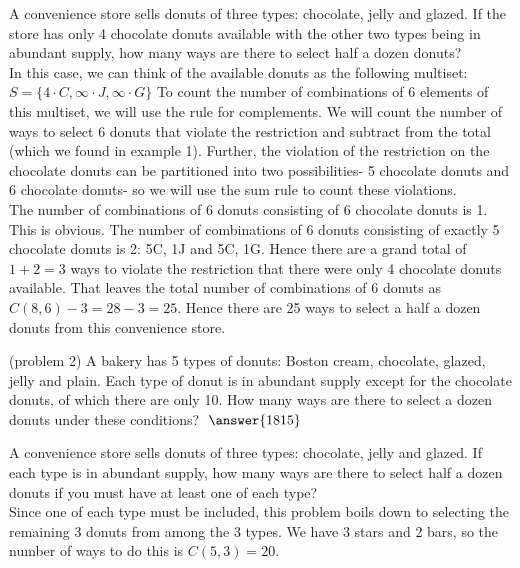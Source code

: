 \documentclass[handout]{ximera}
\begin{document}
 

\begin{example}[example 2]
A convenience store sells donuts of three types: chocolate, jelly and glazed.  
If the store has only 4 chocolate donuts available with the other two types 
being in abundant supply, how many ways are there to select half a dozen donuts?\\
In this case, we can think of the available donuts as the following multiset: 
$S = \{4\cdot C, \infty \cdot J, \infty \cdot G\}$ To count the number of 
combinations of 6 elements of this multiset, we will use the rule for complements. 
We will count the number of ways to select 6 donuts that violate the restriction and 
subtract from the total (which we found in example 1).  Further, the violation of the 
restriction on the chocolate donuts can be partitioned into two possibilities- 5 chocolate 
donuts and 6 chocolate donuts- so we will use the sum rule to count these violations.\\
The number of combinations of 6 donuts consisting of 6 chocolate donuts is 1. 
This is obvious.  The number of combinations of 6 donuts consisting of 
exactly 5 chocolate donuts is 2: 5C, 1J and 5C, 1G.  
Hence there are a grand total of $1+2 =3$
ways to violate the restriction that there were only 4 chocolate donuts available.  
That leaves the total number of combinations of 6 donuts as $C(8,6) -3 = 28 - 3 = 25$.
Hence there are 25 ways to select a half a dozen donuts from this convenience store.
\end{example}


\begin{problem}(problem 2)
A bakery has 5 types of donuts: Boston cream, chocolate, glazed, jelly and plain.
Each type of donut is in abundant supply except for the chocolate donuts, of which there are only 10. 
How many ways are there to select a dozen donuts under these conditions? $\; \answer{1815}$
\end{problem}


\begin{example}[example 3]
A convenience store sells donuts of three types: chocolate, jelly and glazed.  
If each type is in abundant supply, how many ways are there to select half a 
dozen donuts if you must have at least one of each type?\\
Since one of each type must be included, this problem boils down to selecting the 
remaining 3 donuts from among the 3 types. We have 3 stars and 2 bars, so
the number of ways to do this is $C(5, 3) = 20$.
\end{example}
\end{document}
